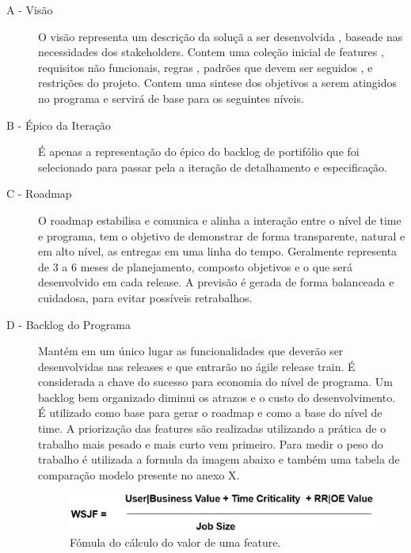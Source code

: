   \begin{description}
    \item[A - Visão]
    O visão representa um descrição da soluçã a ser desenvolvida , baseade nas necessidades
    dos stakeholders. Contem uma coleção inicial de features , requisitos não funcionais,
    regras , padrões que devem ser seguidos , e restrições do projeto. Contem uma sintese dos
    objetivos a serem atingidos no programa e servirá de base para os seguintes níveis.\cite{vision}
    \item[B - Épico da Iteração]
    É apenas a representação do épico do backlog de portifólio que foi selecionado
    para passar pela a iteração de detalhamento e especificação.
    \item[C - Roadmap]
    O roadmap estabilisa e comunica e alinha a interação entre o nível de time e programa,
    tem o objetivo de demonstrar de forma transparente, natural e em alto nível, as entregas
    em uma linha do tempo. Geralmente representa de 3 a 6 meses de planejamento, composto objetivos
    e o que será desenvolvido em cada release. A previsão é gerada de forma balanceada e cuidadosa,
    para evitar possíveis retrabalhos. \cite{roadmap}
    \item[D - Backlog do Programa]
    Mantém em um único lugar as funcionalidades que deverão ser desenvolvidas nas releases
    e que entrarão no ágile release train. É considerada a chave do sucesso para economia
    do nível de programa. Um backlog bem organizado diminui os atrazos e o custo do desenvolvimento.
    É utilizado como base para gerar o roadmap e como a base do nível de time\cite{programbacklog}.
    A priorização das features são realizadas utilizando a prática de o trabalho mais pesado e
    mais curto vem primeiro. Para medir o peso do trabalho é utilizada a formula da imagem abaixo  e também
    uma tabela de comparação modelo presente no anexo X\cite{wsjf}.

    \begin{figure}[H]
        \centering
      \includegraphics[keepaspectratio=true,scale=0.3]{figuras/WSJF-Formula.eps}
        \caption{Fómula do cálculo do valor de uma feature.}
        \label{fig:wsjf}
    \end{figure}


  \end{description}


